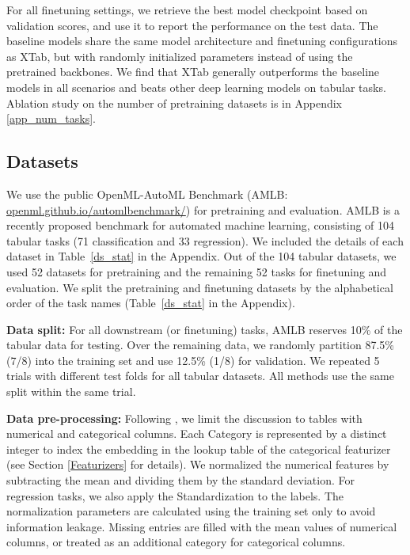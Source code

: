 For all finetuning settings, we retrieve the best model checkpoint based on validation scores, and use it to report the performance on the test data. The baseline models share the same model architecture and finetuning configurations as XTab, but with randomly initialized parameters instead of using the pretrained backbones. We find that XTab generally outperforms the baseline models in all scenarios and beats other deep learning models on tabular tasks.  Ablation study on the number of pretraining datasets is in Appendix \ref{app_num_tasks}. 

\subsection{Datasets} 
We use the public OpenML-AutoML Benchmark (AMLB: \url{openml.github.io/automlbenchmark/}) \citep{gijsbers2022amlb} for pretraining and evaluation. AMLB is a recently proposed benchmark for automated machine learning, consisting of 104 tabular tasks (71 classification and 33 regression). We included the details of each dataset in Table~\ref{ds_stat} in the Appendix. Out of the 104 tabular datasets, we used 52 datasets for pretraining and the remaining 52 tasks for finetuning and evaluation. We split the pretraining and finetuning datasets by the alphabetical order of the task names (Table~\ref{ds_stat} in the Appendix).  

\textbf{Data split:} For all downstream (or finetuning) tasks, AMLB reserves 10\% of the tabular data for testing. Over the remaining data, we randomly partition 87.5\% (7/8) into the training set and use 12.5\% (1/8) for validation. We repeated 5 trials with different test folds for all tabular datasets. All methods use the same split within the same trial. 

\textbf{Data pre-processing:} Following \citet{bahri2021scarf, somepalli2021saint, wang2022transtab}, we limit the discussion to tables with numerical and categorical columns. Each Category is represented by a distinct integer to index the embedding in the lookup table of the categorical featurizer (see Section \ref{Featurizers} for details). We normalized the numerical features by subtracting the mean and dividing them by the standard deviation. For regression tasks, we also apply the Standardization to the labels. The normalization parameters are calculated using the training set only to avoid information leakage. Missing entries are filled with the mean values of numerical columns, or treated as an additional category for categorical columns. 

